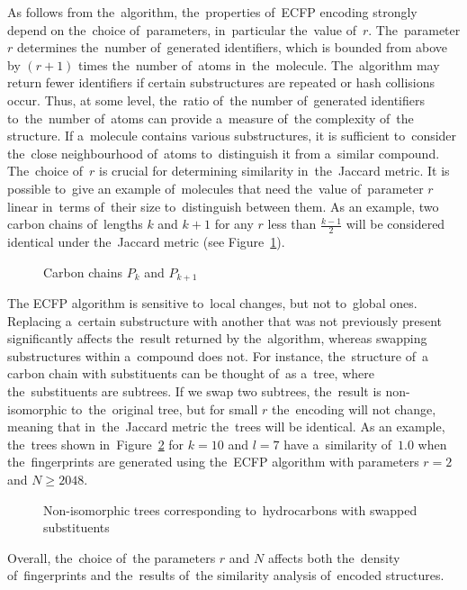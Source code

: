 As follows from the~algorithm, the~properties of~ECFP encoding strongly depend on the~choice of~parameters, in~particular the~value of~\( r \). The~parameter \( r \) determines the~number of~generated identifiers, which is bounded from above by \( (r+1) \) times the~number of~atoms in~the~molecule. The~algorithm may return fewer identifiers if certain substructures are repeated or hash collisions occur. Thus, at some level, the~ratio of~the number of~generated identifiers to~the~number of~atoms can provide a~measure of~the complexity of~the structure. If a~molecule contains various substructures, it is sufficient to~consider the~close neighbourhood of~atoms to~distinguish it from a~similar compound. The~choice of~\( r \) is crucial for determining similarity in~the~Jaccard metric. It is possible to~give an example of~molecules that need the~value of~parameter \( r \) linear in~terms of~their size to~distinguish between them. As an example, two carbon chains of~lengths \( k \) and \( k+1 \) for any \( r \) less than \( \frac{k-1}{2} \) will be considered identical under the~Jaccard metric (see Figure~\ref{fig:chain}).

\begin{figure}[H]
\centering
\resizebox{0.85\textwidth}{!}{
    
}
\caption{Carbon chains \( P_{k} \) and \( P_{k+1} \)}
\label{fig:chain}
\end{figure}

The ECFP algorithm is sensitive to~local changes, but not to~global ones. Replacing a~certain substructure with another that was not previously present significantly affects the~result returned by the~algorithm, whereas swapping substructures within a~compound does not. For instance, the~structure of~a carbon chain with substituents can be thought of~as a~tree, where the~substituents are subtrees. If we swap two subtrees, the~result is non-isomorphic to~the~original tree, but for small \( r \) the~encoding will not change, meaning that in~the~Jaccard metric the~trees will be identical. As an example, the~trees shown in~Figure~\ref{fig:nonisomorphic} for \( k = 10 \) and \( l = 7 \) have a~similarity of~\( 1.0 \) when the~fingerprints are generated using the~ECFP algorithm with parameters \( r=2 \) and \( N \geq 2048 \).

\begin{figure}[H]
\centering
\resizebox{0.7\textwidth}{!}{
    
}
\caption{Non-isomorphic trees corresponding to~hydrocarbons with swapped substituents}
\label{fig:nonisomorphic}
\end{figure}
Overall, the~choice of~the parameters \( r \) and \( N \) affects both the~density of~fingerprints and the~results of~the similarity analysis of~encoded structures.